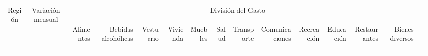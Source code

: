{%
 }%
{%
 } %
{%
 } %
{%
  	\begin{tabular}{@{}ccrrrrrrrrrrrrr@{}}\toprule
 		\multirow{2}{2cm}{Región}&  \multirow{2}{1cm}{Variación mensual} &  \phantom{abc} &  \multicolumn{10}{c}{División del Gasto}\\
 		\cmidrule{3-14}
 		& & \begin{sideways}Alimentos\end{sideways} &  \begin{sideways}Bebidas alcohólicas\end{sideways} &  \begin{sideways}Vestuario\end{sideways} &  \begin{sideways}Vivienda\end{sideways} &  \begin{sideways}Muebles\end{sideways} &  \begin{sideways}Salud\end{sideways} &  \begin{sideways}Transporte\end{sideways} &  \begin{sideways}Comunicaciones\end{sideways} &  \begin{sideways}Recreación\end{sideways} &  \begin{sideways}Educación\end{sideways} &  \begin{sideways}Restaurantes\end{sideways} &  \begin{sideways} Bienes diversos \end{sideways}\\
 		\cmidrule{1-14} 
	\bottomrule
	\end{tabular}
}%
{%
 } %
 
 


{%
 }%
{%
 } %
{%
 } %
{%
 \begin{tikzpicture}[x=1pt,y=1pt]    \end{tikzpicture}}%
{%
 } %
 
